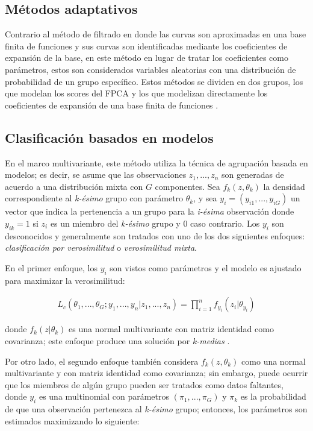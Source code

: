 \documentclass[
]{book}
\begin{document}
\hypertarget{muxe9todos-adaptativos}{%
\subsection{Métodos adaptativos}\label{muxe9todos-adaptativos}}

Contrario al método de filtrado en donde las curvas son aproximadas en una base finita de funciones y sus curvas son identificadas mediante los coeficientes de expansión de la base, en este método en lugar de tratar los coeficientes como parámetros, estos son considerados variables aleatorias con una distribución de probabilidad de un grupo específico. Estos métodos se dividen en dos grupos, los que modelan los scores del FPCA y los que modelizan directamente los coeficientes de expansión de una base finita de funciones \citep{Jaque}.

\hypertarget{clasificaciuxf3n-basados-en-modelos}{%
\subsection{Clasificación basados en modelos}\label{clasificaciuxf3n-basados-en-modelos}}

En el marco multivariante, este método utiliza la técnica de agrupación basada en modelos; es decir, se asume que las observaciones \(z_1,...,z_n\) son generadas de acuerdo a una distribución mixta con \(G\) componentes. Sea \(f_k(z,\theta_k)\) la densidad correspondiente al \emph{k-ésimo} grupo con parámetro \(\theta_k\), y sea \(y_i=(y_{i1},...,y_{iG})\) un vector que indica la pertenencia a un grupo para la \emph{i-ésima} observación donde \(y_{ik}=1\) si \(z_i\) es un miembro del \emph{k-ésimo} grupo y \(0\) caso contrario. Los \(y_i\) son desconocidos y generalmente son tratados con uno de los dos siguientes enfoques: \emph{clasificación por verosimilitud} o \emph{verosimilitud mixta}.

En el primer enfoque, los \(y_i\) son vistos como parámetros y el modelo es ajustado para maximizar la verosimilitud:

\begin{align*}
    L_c(\theta_1,...,\theta_G;y_1,...,y_n|z_1,...,z_n)=\prod_{i=1}^n {f_{y_i}(z_i|\theta_{y_i})}
\end{align*}

donde \(f_{k}(z|\theta_k)\) es una normal multivariante con matriz identidad como covarianza; este enfoque produce una solución por \emph{k-medias} \citep{sugar}.

Por otro lado, el segundo enfoque también considera \(f_k(z,\theta_k)\) como una normal multivariante y con matriz identidad como covarianza; sin embargo, puede ocurrir que los miembros de algún grupo pueden ser tratados como datos faltantes, donde \(y_i\) es una multinomial con parámetros \((\pi_1,...,\pi_G)\) y \(\pi_k\) es la probabilidad de que una observación pertenezca al \emph{k-ésimo} grupo; entonces, los parámetros son estimados maximizando lo siguiente:
\end{document}
